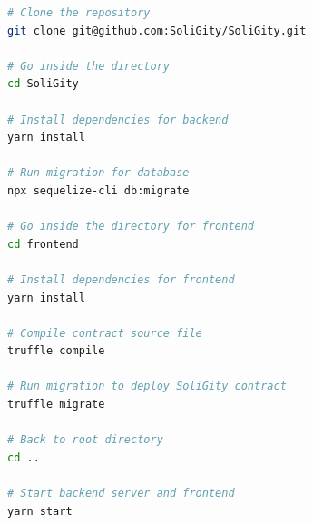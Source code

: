 \documentclass[12pt]{article}
\renewcommand{\_}{\kern-1.5pt\textunderscore\kern-1.5pt}
\begin{document}
\begin{minipage}[b]{0.45\textwidth}
	\begin{lstlisting}[language=bash,label={lst:setup},caption={Setup Shell Script},captionpos=b]
# Clone the repository
git clone git@github.com:SoliGity/SoliGity.git

# Go inside the directory
cd SoliGity

# Install dependencies for backend
yarn install

# Run migration for database
npx sequelize-cli db:migrate

# Go inside the directory for frontend
cd frontend

# Install dependencies for frontend
yarn install

# Compile contract source file
truffle compile

# Run migration to deploy SoliGity contract
truffle migrate

# Back to root directory
cd ..

# Start backend server and frontend
yarn start
				\end{lstlisting}
\end{minipage}\hfill
\end{document}
